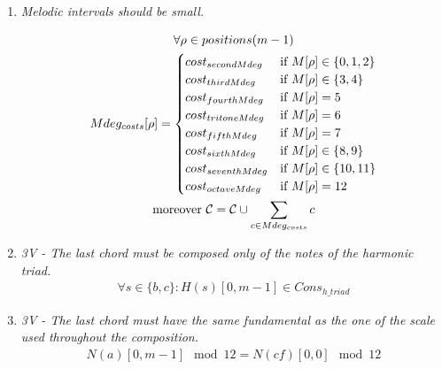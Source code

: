 \begin{enumerate}[wide, label=\bfseries G\arabic*]
    \item \textit{Melodic intervals should be small.}\label{rule:smallmelody}

    \begin{equation}\label{eq:mdeg_costs}
        \begin{gathered}
            \forall \rho \in positions(m-1)\\
            Mdeg_{costs}[\rho] = \begin{cases}
                cost_{secondMdeg} & \text{if } M[\rho] \in \{0, 1, 2\}\\
                cost_{thirdMdeg} & \text{if } M[\rho] \in \{3, 4\}\\
                cost_{fourthMdeg} & \text{if } M[\rho] = 5\\
                cost_{tritoneMdeg} & \text{if } M[\rho] = 6\\
                cost_{fifthMdeg} & \text{if } M[\rho] = 7\\
                cost_{sixthMdeg} & \text{if } M[\rho] \in \{8, 9\}\\
                cost_{seventhMdeg} & \text{if } M[\rho] \in \{10, 11\}\\
                cost_{octaveMdeg} & \text{if } M[\rho] = 12\\
            \end{cases}\\
            \text{moreover } \mathcal{C} = \mathcal{C} \cup \sum _{c \in Mdeg_{costs}} c
        \end{gathered}
    \end{equation}

    \item\label{rule:last-chord-h-triad-appendix} \textit{3V - The last chord must be composed only of the notes of the harmonic triad.} 
\begin{equation} \begin{aligned}
    \forall s \in \{b, c\} \colon H(s)[0, m-1] \in Cons_{h\_triad}
\end{aligned} \end{equation}

\item \textit{3V - The last chord must have the same fundamental as the one of the scale used throughout the composition.}\label{rule:same-fundamental-appendix}
\begin{equation} \begin{aligned}
    N(a)[0, m-1] \mod 12 = N(cf)[0, 0] \mod 12
    \end{aligned} \end{equation}
\end{enumerate}


